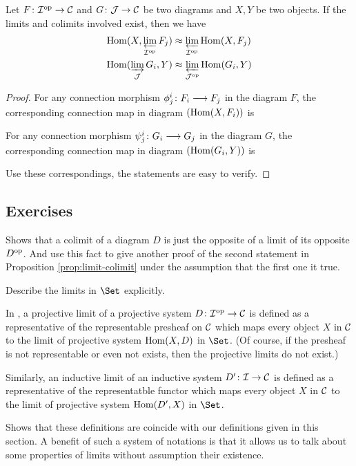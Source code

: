 \begin{prop}\label{prop:limit-colimit}
  Let $F\colon{\cal I}^{\operatorname{op}}\to{\cal C}$ and $G\colon{\cal J}\to{\cal C}$ be two diagrams and $X, Y$ be two objects. If the limits and colimits involved exist, then we have
  \begin{align*}
    \operatorname{Hom}(X,\operatorname*{\underleftarrow{\lim}}_{{\cal I}^{\operatorname{op}}} F_j) &\approx \operatorname*{\underleftarrow{\lim}}_{{\cal I}^{\operatorname{op}}} \operatorname{Hom}(X,F_j) \\
    \operatorname{Hom}(\operatorname*{\underrightarrow{\lim}}_{{\cal J}} G_i, Y) &\approx \operatorname*{\underleftarrow{\lim}}_{{\cal J}^{\operatorname{op}}} \operatorname{Hom}(G_i,Y)
  \end{align*}
\end{prop}
  \begin{proof}
    For any connection morphism $\phi^i_j\colon F_i\longrightarrow F_j$ in the diagram $F$, the corresponding connection map in diagram $(\operatorname{Hom}(X,F_i))$ is

    For any connection morphism $\psi^i_j\colon G_i\longrightarrow G_j$ in the diagram $G$, the corresponding connection map in diagram $(\operatorname{Hom}(G_i,Y))$ is

    Use these correspondings, the statements are easy to verify.
  \end{proof}
\subsection{Exercises}
  \begin{ex}
    Shows that a colimit of a diagram $D$ is just the opposite of a limit of its opposite $D^{\operatorname{op}}$. And use this fact to give another proof of the second statement in Proposition \ref{prop:limit-colimit} under the assumption that the first one it true.
  \end{ex}
  \begin{ex}
    Describe the limits in $\Set$ explicitly.
  \end{ex}
  \begin{ex}\label{def:limit as rep functor}
    In \cite{Cat&Shf}, a projective limit of a projective system $D\colon{\cal I}^{\operatorname{op}}\to{\cal C}$ is defined as a representative of the representable presheaf on ${\cal C}$ which maps every object $X$ in ${\cal C}$ to the limit of projective system $\operatorname{Hom}(X,D)$ in $\Set$.
    (Of course, if the presheaf is not representable or even not exists, then the projective limits do not exist.)

    Similarly, an inductive limit of an inductive system $D'\colon{\cal I}\to{\cal C}$ is defined as a representative of the representatble functor which maps every object $X$ in ${\cal C}$ to the limit of projective system $\operatorname{Hom}(D',X)$ in $\Set$.

    Shows that these definitions are coincide with our definitions given in this section. A benefit of such a system of notations is that it allows us to talk about some properties of limits without assumption their existence.
  \end{ex}

